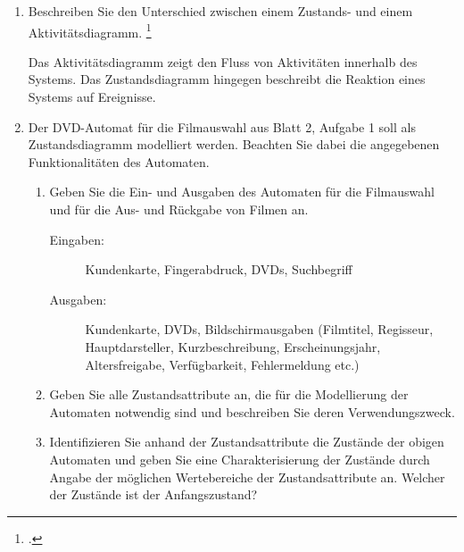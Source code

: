 \documentclass{bschlangaul-aufgabe}
\begin{document}

\begin{enumerate}
\item Beschreiben Sie den Unterschied zwischen einem Zustands- und einem
Aktivitätsdiagramm.
\footcite{sosy:ab:3}

\begin{bAntwort}
Das Aktivitätsdiagramm zeigt den Fluss von Aktivitäten innerhalb des
Systems. Das Zustandsdiagramm hingegen beschreibt die Reaktion eines
Systems auf Ereignisse.
\end{bAntwort}

\item Der DVD-Automat für die Filmauswahl aus Blatt 2, Aufgabe 1 soll
als Zustandsdiagramm modelliert werden. Beachten Sie dabei die
angegebenen Funktionalitäten des Automaten.

\begin{enumerate}
\item Geben Sie die Ein- und Ausgaben des Automaten für die Filmauswahl
und für die Aus- und Rückgabe von Filmen an.

\begin{bAntwort}
\begin{description}
\item[Eingaben:]

Kundenkarte, Fingerabdruck, DVDs, Suchbegriff

\item[Ausgaben:]

Kundenkarte, DVDs, Bildschirmausgaben (Filmtitel, Regisseur,
Hauptdarsteller, Kurzbeschreibung, Erscheinungsjahr, Altersfreigabe,
Verfügbarkeit, Fehlermeldung etc.)
\end{description}
\end{bAntwort}

\item Geben Sie alle Zustandsattribute an, die für die Modellierung der
Automaten notwendig sind und beschreiben Sie deren Verwendungszweck.

\item Identifizieren Sie anhand der Zustandsattribute die Zustände der
obigen Automaten und geben Sie eine Charakterisierung der Zustände durch
Angabe der möglichen Wertebereiche der Zustandsattribute an. Welcher der
Zustände ist der Anfangszustand?


\end{enumerate}
\end{enumerate}
\end{document}
